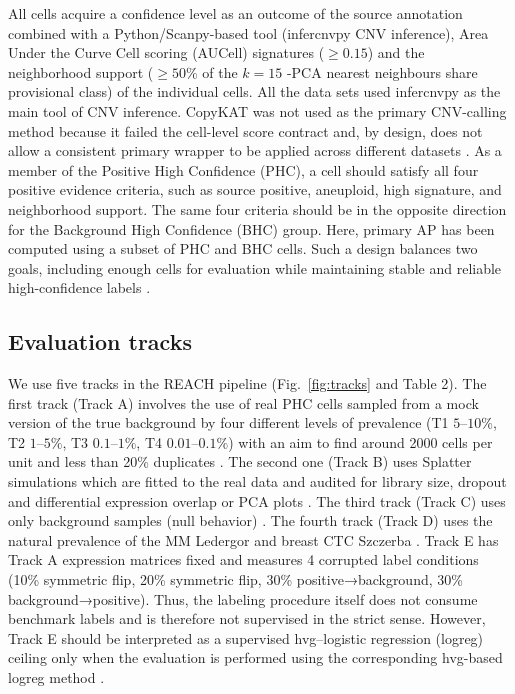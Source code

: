 \documentclass[10pt]{article}
\begin{document}
All cells acquire a confidence level as an outcome of the source annotation combined with a Python/Scanpy-based tool (infercnvpy CNV inference), Area Under the Curve Cell scoring (AUCell) signatures ($\geq 0.15$) and the neighborhood support ($\geq50\%$ of the $k=15$ -PCA nearest neighbours share provisional class) of the individual cells\cite{chen2025benchmarking,gao2021delineating,hetzel2021graph,fa2026cell}. All the data sets used infercnvpy as the main tool of CNV inference. CopyKAT was not used as the primary CNV-calling method because it failed the cell-level score contract and, by design, does not allow a consistent primary wrapper to be applied across different datasets \cite{chen2025benchmarking}. As a member of the Positive High Confidence (PHC), a cell should satisfy all four positive evidence criteria, such as source positive, aneuploid, high signature, and neighborhood support. The same four criteria should be in the opposite direction for the Background High Confidence (BHC) group. Here, primary AP has been computed using a subset of PHC and BHC cells. Such a design balances two goals, including enough cells for evaluation while maintaining stable and reliable high-confidence labels \cite{stegle2015computational,abdelaal2019comparison}.

\subsection{Evaluation tracks}

We use five tracks in the REACH pipeline (Fig.~\ref{fig:tracks} and Table 2). The first track (Track A) involves the use of real PHC cells sampled from a mock version of the true background by four different levels of prevalence (T1 $5$--$10\%$, T2 $1$--$5\%$, T3 $0.1$--$1\%$, T4 $0.01$--$0.1\%$)  with an aim to find around 2000 cells per unit and less than 20\% duplicates \cite{johnson2019survey,altalhan2025imbalanced}. The second one (Track B) uses Splatter simulations which are fitted to the real data and audited for library size, dropout and differential expression overlap or PCA plots \cite{cao2021benchmark}. The third track (Track C) uses only background samples (null behavior) \cite{torre2018rare}. The fourth track (Track D) uses the natural prevalence of the MM Ledergor and breast CTC Szczerba \cite{peng2019single,qian2020pan}. Track E has Track A expression matrices fixed and measures 4 corrupted label conditions (10\% symmetric flip, 20\% symmetric flip, 30\% positive→background, 30\% background→positive). Thus, the labeling procedure itself does not consume benchmark labels and is therefore not supervised in the strict sense. However, Track E should be interpreted as a supervised hvg–logistic regression (logreg) ceiling only when the evaluation is performed using the corresponding hvg-based logreg method \cite{mahalanabis2022evaluation}.
\end{document}
